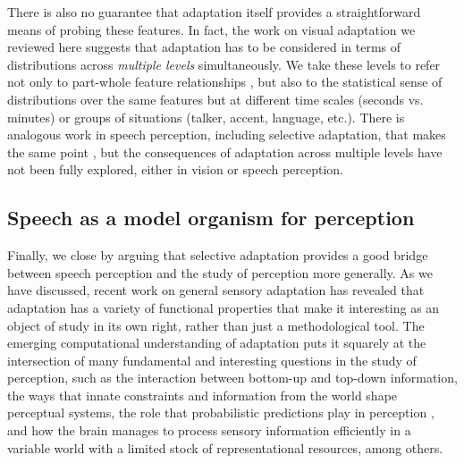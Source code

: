 There is also no guarantee that adaptation itself provides a straightforward means of probing these features.  In fact, the work on visual adaptation we reviewed here suggests that adaptation has to be considered in terms of distributions across \emph{multiple levels} simultaneously.  We take these levels to refer not only to part-whole feature relationships \autocite{He2012}, but also to the statistical sense of distributions over the same features but at different time scales (seconds vs. minutes) \autocite{Chopin2012} or groups of situations (talker, accent, language, etc.). There is analogous work in speech perception, including selective adaptation, that makes the same point \autocites[e.g., adaptation of single segments depends on the syllabic context][]{Bryant1978}[and others summarized in][]{Remez1987}, but the consequences of adaptation across multiple levels have not been fully explored, either in vision or speech perception.


\subsection{Speech as a model organism for perception}
\label{sec:speech-as-model}

Finally, we close by arguing that selective adaptation provides a good bridge between speech perception and the study of perception more generally.  As we have discussed, recent work on general sensory adaptation has revealed that adaptation has a variety of functional properties that make it interesting as an object of study in its own right, rather than just a methodological tool.  The emerging computational understanding of adaptation puts it squarely at the intersection of many fundamental and interesting questions in the study of perception, such as the interaction between bottom-up and top-down information, the ways that innate constraints and information from the world shape perceptual systems, the role that probabilistic predictions play in perception \autocite[e.g.,][]{He2012}, and how the brain manages to process sensory information efficiently in a variable world with a limited stock of representational resources, among others.  

